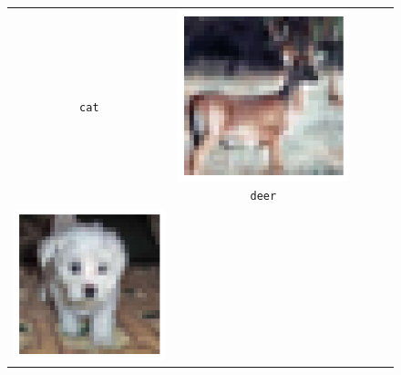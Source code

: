 \begin{figure}[h]
\begin{tabular}{ccccc}
\begin{minipage}[b]{0.15\linewidth}
      \centering\scriptsize\texttt{cat}
    \end{minipage} &
    \begin{minipage}[b]{0.15\linewidth}
      \includegraphics[width=\linewidth]{figures/cifar-images/deer.png}
      \centering\scriptsize\texttt{deer}
    \end{minipage} \\
    \begin{minipage}[b]{0.15\linewidth}
      \includegraphics[width=\linewidth]{figures/cifar-images/dog.png}

\end{minipage}
\end{tabular}
\end{figure}
